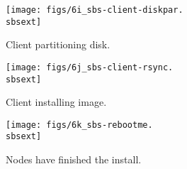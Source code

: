 
\begin{figure}[htbp]
  \begin{center}
    \texttt{[image: figs/6i\_sbs-client-diskpar.\\sbsext]}
    \caption{Client partitioning disk.}
    \label{fig:sbs-install-diskpar}
  \end{center}
\end{figure}

\begin{figure}[htbp]
  \begin{center}
    \texttt{[image: figs/6j\_sbs-client-rsync.\\sbsext]}
    \caption{Client installing image.}
    \label{fig:sbs-install-rsync}
  \end{center}
\end{figure}

\begin{figure}[htbp]
  \begin{center}
    \texttt{[image: figs/6k\_sbs-rebootme.\\sbsext]}
    \caption{Nodes have finished the install.}
    \label{fig:sbs-install-finish}
  \end{center}
\end{figure}

%




